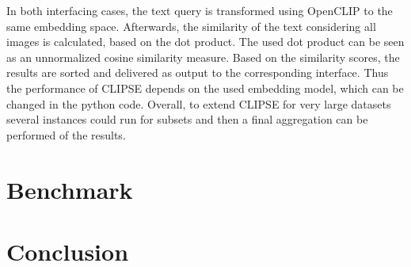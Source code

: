 \documentclass{article}
\begin{document}
In both interfacing cases, the text query is transformed using OpenCLIP to the same embedding space.
Afterwards, the similarity of the text considering all images is calculated, based on the dot product.
The used dot product can be seen as an unnormalized cosine similarity measure.
Based on the similarity scores, the results are sorted and delivered as output to the corresponding interface.
Thus the performance of CLIPSE depends on the used embedding model, which can be changed in the python code.
Overall, to extend CLIPSE for very large datasets several instances could run for subsets and then a final aggregation can be performed of the results.

\section{Benchmark}


\section{Conclusion}




\end{document}
